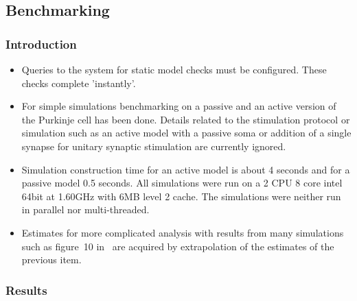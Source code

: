 \documentclass[12pt]{article}
\begin{document}
\subsection*{Benchmarking}

\subsubsection*{Introduction}

\begin{itemize}
\item Queries to the system for static model checks must be
  configured.  These checks complete 'instantly'.
\item For simple simulations benchmarking on a passive and an active
  version of the Purkinje cell has been done.  Details related to the
  stimulation protocol or simulation such as an active model with a
  passive soma or addition of a single synapse for unitary synaptic
  stimulation are currently ignored.
\item Simulation construction time for an active model is about 4
  seconds and for a passive model 0.5 seconds.  All simulations were
  run on a 2 CPU 8 core intel 64bit at 1.60GHz with 6MB level 2 cache.
  The simulations were neither run in parallel nor multi-threaded.
\item Estimates for more complicated analysis with results from many
  simulations such as figure~10 in~\cite{E:1994hc} are acquired by
  extrapolation of the estimates of the previous item.
\end{itemize}


\subsubsection*{Results}
\end{document}
